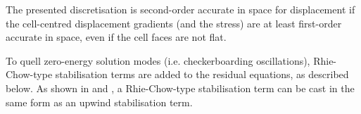 \documentclass[sn-mathphys,Numbered]{sn-jnl}%
\newcommand{\bb}{\boldsymbol}
\begin{document}
The presented discretisation is second-order accurate in space for displacement if the cell-centred displacement gradients (and the stress) are at least first-order accurate in space, even if the cell faces are not flat.

To quell zero-energy solution modes (i.e. checkerboarding oscillations), Rhie-Chow-type stabilisation terms \cite{Rhie1983} are added to the residual equations, as described below.
As shown in \citet{Cardiff2025jfnk} and \citet{Cardiff2020}, a Rhie-Chow-type stabilisation term can be cast in the same form as an upwind stabilisation term.


\end{document}
